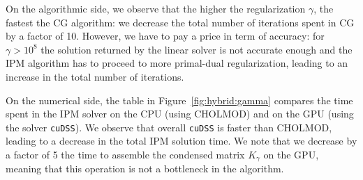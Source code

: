 On the algorithmic side, we observe that the higher the regularization $\gamma$,
the fastest the CG algorithm: we decrease the total number of iterations
spent in CG by a factor of 10. However, we have to pay a price in term
of accuracy: for $\gamma > 10^8$ the solution returned by the linear solver
is not accurate enough and the IPM algorithm has to proceed to more
primal-dual regularization, leading to an increase in the total number of iterations.

On the numerical side, the table in Figure~\ref{fig:hybrid:gamma} compares
the time spent in the IPM solver on the CPU (using CHOLMOD) and on the GPU
(using the solver {\tt cuDSS}). We observe that overall {\tt cuDSS} is
faster than CHOLMOD, leading to a decrease in the total IPM solution time.
We note that we decrease by a factor of 5 the time to assemble the condensed
matrix $K_\gamma$ on the GPU, meaning that this operation is not a bottleneck in
the algorithm.

